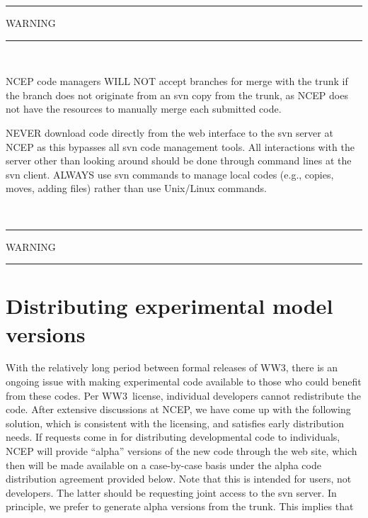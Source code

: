 \documentclass[12pt]{article}
\newcommand{\ws}{WW3}
\newcommand{\file}{\sf}
\newcommand{\pb}{\strut \vfill \pagebreak}
\newcommand{\bpage}{\vfill \pagebreak \strut

\vspace{2.5in} \centerline{This page is intentionally left blank.}}
\newcommand{\newsec}{\setcounter{equation}{0}
                      \setcounter{myfigno}{0}
                      \setcounter{mytabno}{0}}
\newcounter{myfigno}[section]
\newcounter{mytabno}[section]
\begin{document}
\vspace{\baselineskip}
\begin{center}
\rule[1mm]{55mm}{1.0mm} WARNING \rule[1mm]{55mm}{1.0mm} \\ 
\vspace{\baselineskip} \label{svn_w}
\parbox{120mm}{NCEP code managers WILL NOT accept branches for merge with the
trunk if the branch does not originate from an {\file svn copy} from the
trunk, as NCEP does not have the resources to manually merge each submitted
code.

\vspace{\baselineskip} \noindent 
NEVER download code directly from the web interface to the svn server at NCEP
as this bypasses all svn code management tools. All interactions with the
server other than looking around should be done through command lines at the
svn client. ALWAYS use svn commands to manage local codes (e.g., copies,
moves, adding files) rather than use Unix/Linux commands.} \\
\vspace{\baselineskip} \rule[1mm]{55mm}{1.0mm} WARNING \rule[1mm]{55mm}{1.0mm}
\end{center}

\pb
\section{Distributing experimental model versions} \label{sec:dist}
\newsec

With the relatively long period between formal releases of \ws, there is an
ongoing issue with making experimental code available to those who could
benefit from these codes.  Per \ws\ license, individual developers cannot
redistribute the code. After extensive discussions at NCEP, we have come up
with the following solution, which is consistent with the licensing, and
satisfies early distribution needs. If requests come in for distributing
developmental code to individuals, NCEP will provide ``alpha'' versions of the
new code through the web site, which then will be made available on a
case-by-case basis under the alpha code distribution agreement provided
below. Note that this is intended for users, not developers. The latter should
be requesting joint access to the svn server. In principle, we prefer to
generate alpha versions from the trunk. This implies that 
\end{document}
